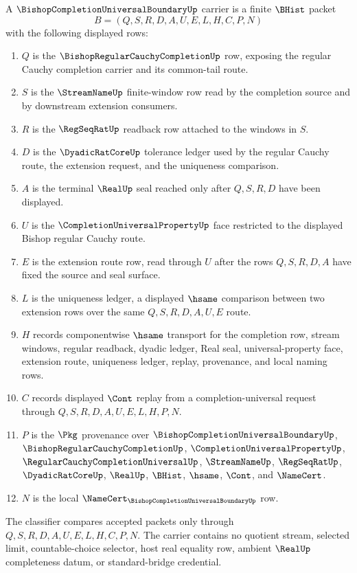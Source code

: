 \begin{definition}
\label{def:bishop-completion-universal-boundary-carrier}
A $\BishopCompletionUniversalBoundaryUp$ carrier is a finite $\BHist$ packet
$$
B=(Q,S,R,D,A,U,E,L,H,C,P,N)
$$
with the following displayed rows:
\begin{enumerate}
\item $Q$ is the $\BishopRegularCauchyCompletionUp$ row, exposing the regular Cauchy completion carrier and its common-tail route.
\item $S$ is the $\StreamNameUp$ finite-window row read by the completion source and by downstream extension consumers.
\item $R$ is the $\RegSeqRatUp$ readback row attached to the windows in $S$.
\item $D$ is the $\DyadicRatCoreUp$ tolerance ledger used by the regular Cauchy route, the extension request, and the uniqueness comparison.
\item $A$ is the terminal $\RealUp$ seal reached only after $Q,S,R,D$ have been displayed.
\item $U$ is the $\CompletionUniversalPropertyUp$ face restricted to the displayed Bishop regular Cauchy route.
\item $E$ is the extension route row, read through $U$ after the rows $Q,S,R,D,A$ have fixed the source and seal surface.
\item $L$ is the uniqueness ledger, a displayed $\hsame$ comparison between two extension rows over the same $Q,S,R,D,A,U,E$ route.
\item $H$ records componentwise $\hsame$ transport for the completion row, stream windows, regular readback, dyadic ledger, Real seal, universal-property face, extension route, uniqueness ledger, replay, provenance, and local naming rows.
\item $C$ records displayed $\Cont$ replay from a completion-universal request through $Q,S,R,D,A,U,E,L,H,P,N$.
\item $P$ is the $\Pkg$ provenance over $\BishopCompletionUniversalBoundaryUp$, $\BishopRegularCauchyCompletionUp$, $\CompletionUniversalPropertyUp$, $\RegularCauchyCompletionUniversalUp$, $\StreamNameUp$, $\RegSeqRatUp$, $\DyadicRatCoreUp$, $\RealUp$, $\BHist$, $\hsame$, $\Cont$, and $\NameCert$.
\item $N$ is the local $\NameCert_{\BishopCompletionUniversalBoundaryUp}$ row.
\end{enumerate}
The classifier compares accepted packets only through $Q,S,R,D,A,U,E,L,H,C,P,N$. The carrier contains no quotient stream, selected limit, countable-choice selector, host real equality row, ambient $\RealUp$ completeness datum, or standard-bridge credential.
\end{definition}

